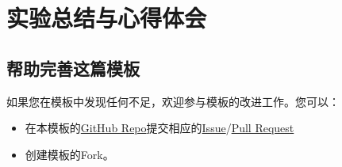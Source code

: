 \chapter{实验总结与心得体会}

\section{帮助完善这篇模板}\label{sec:joinus}

如果您在模板中发现任何不足，欢迎参与模板的改进工作。您可以：

\begin{itemize}
    \item 在本模板的\href{https://github.com/GitHubonline1396529/dlmuucexpreport}{GitHub Repo}提交相应的\href{https://github.com/GitHubonline1396529/dlmuucexpreport/issues}{Issue}/\href{https://github.com/GitHubonline1396529/dlmuucexpreport/pulls}{Pull Request}
    \item 创建模板的Fork。
\end{itemize}
